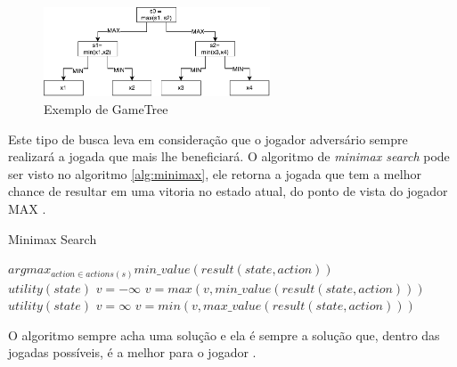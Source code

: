\begin{figure}[ht]
	\centering
	\includegraphics[width=0.6\textwidth]{fig/gametree.pdf}
	\caption{Exemplo de GameTree}
	\label{fig:gametree}
\end{figure} 

Este tipo de busca leva em consideração que o jogador adversário sempre realizará a jogada que mais lhe beneficiará. O algoritmo de \textit{minimax search} pode ser visto no algoritmo \ref{alg:minimax}, ele retorna a jogada que tem a melhor chance de resultar em uma vitoria no estado atual, do ponto de vista do jogador MAX \cite{intelligence2003modern}. 

\begin{algorithm}
	\caption{Minimax Search}
	\label{alg:minimax}
	\begin{algorithmic}[]	
		\State \Return $arg max_{action \in actions(s)} min\_value(result(state, action)) $
		\EndFunction \\
		\State	\Return $utility(state)$
		\EndIf
		\State $v = -\infty$
		\State $v = max(v, min\_value(result(state,action)))$
		\EndFor	
		\EndFunction \\
		\State	\Return $utility(state)$
		\EndIf
		\State $v = \infty$
		\State $v = min(v, max\_value(result(state,action)))$
		\EndFor	
		\EndFunction
	\end{algorithmic}
\end{algorithm}

O algoritmo sempre acha uma solução e ela é sempre a solução que, dentro das jogadas possíveis, é a melhor para o jogador \cite{intelligence2003modern}.  

